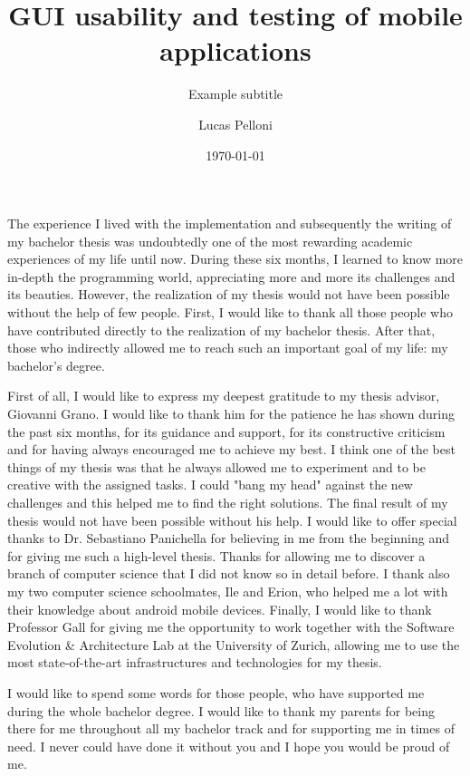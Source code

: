 \documentclass{seal_thesis}
\date{\today}
\title{GUI usability and testing of mobile applications}
\subtitle{Example subtitle}
\author{Lucas Pelloni}
\begin{document}
\maketitle



\frontmatter




\begin{acknowledgements}
The experience I lived with the implementation and subsequently the writing of my bachelor thesis was undoubtedly one of the most rewarding academic experiences of my life until now. During these six months, I learned to know more in-depth the programming world, appreciating more and more its challenges and its beauties.
However, the realization of my thesis would not have been possible without the help of few people. First, I would like to thank all those people who have contributed directly to the realization of my bachelor thesis. After that, those who indirectly allowed me to reach such an important goal of my life: my bachelor's degree.

First of all, I would like to express my deepest gratitude to my thesis advisor, Giovanni Grano. I would like to thank him for the patience he has shown during the past six months, for its guidance and support, for its constructive criticism and for having always encouraged me to achieve my best. I think one of the best things of my thesis was that he always allowed me to experiment and to be creative with the assigned tasks. I could  "bang my head" against the new challenges and this helped me to find the right solutions.
The final result of my thesis would not have been possible without his help. 
I would like to offer special thanks to Dr. Sebastiano Panichella for believing in me from the beginning and for giving me such a high-level thesis. Thanks for allowing me to discover a branch of computer science that I did not know so in detail before. 
I thank also my two computer science schoolmates, Ile and Erion, who helped me a lot with their knowledge about android mobile devices.
Finally, I would like to thank Professor Gall for giving me the opportunity to work together with the Software Evolution \& Architecture Lab at the University of Zurich, allowing me to use the most state-of-the-art infrastructures and technologies for my thesis. 

I would like to spend some words for those people, who have supported me during the whole bachelor degree. 
I would like to thank my parents for being there for me throughout all my bachelor track and for supporting me in times of need. 
I never could have done it without you and I hope you would be proud of me. 
\end{acknowledgements}
\end{document}
